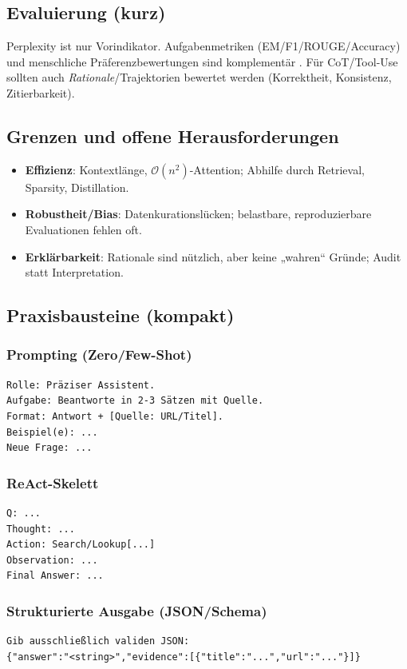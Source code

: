 \subsection{Evaluierung (kurz)}
Perplexity ist nur Vorindikator. Aufgabenmetriken (EM/F1/ROUGE/Accuracy) und menschliche Präferenzbewertungen sind komplementär \cite{ouyang2022training}. Für CoT/Tool-Use sollten auch \emph{Rationale}/Trajektorien bewertet werden (Korrektheit, Konsistenz, Zitierbarkeit).

\subsection{Grenzen und offene Herausforderungen}
\begin{itemize}
  \item \textbf{Effizienz}: Kontextlänge, $\mathcal{O}(n^2)$-Attention; Abhilfe durch Retrieval, Sparsity, Distillation.
  \item \textbf{Robustheit/Bias}: Datenkurationslücken; belastbare, reproduzierbare Evaluationen fehlen oft.
  \item \textbf{Erklärbarkeit}: Rationale sind nützlich, aber keine „wahren“ Gründe; Audit statt Interpretation.
\end{itemize}

\subsection{Praxisbausteine (kompakt)}
\subsubsection*{Prompting (Zero/Few-Shot)}
\begin{verbatim}
Rolle: Präziser Assistent.
Aufgabe: Beantworte in 2-3 Sätzen mit Quelle.
Format: Antwort + [Quelle: URL/Titel].
Beispiel(e): ...
Neue Frage: ...
\end{verbatim}

\subsubsection*{ReAct-Skelett}
\begin{verbatim}
Q: ...
Thought: ...
Action: Search/Lookup[...]
Observation: ...
Final Answer: ...
\end{verbatim}

\subsubsection*{Strukturierte Ausgabe (JSON/Schema)}
\begin{verbatim}
Gib ausschließlich validen JSON:
{"answer":"<string>","evidence":[{"title":"...","url":"..."}]}
\end{verbatim}

